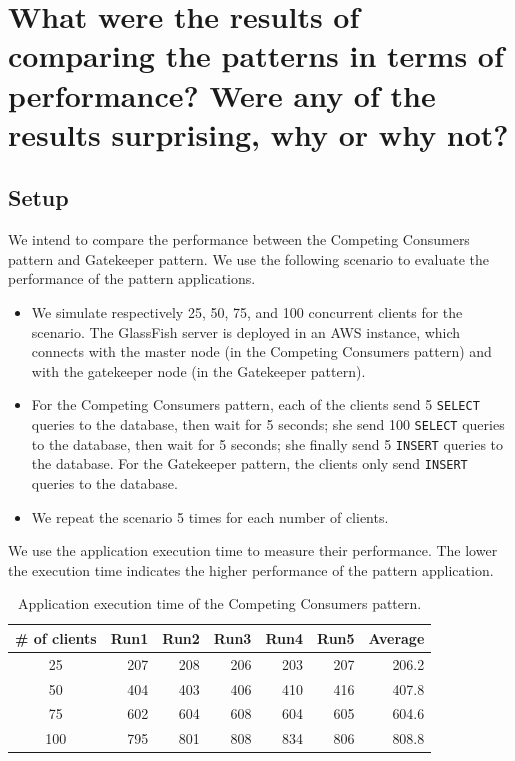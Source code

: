 \documentclass{article}
\begin{document}
\section{What were the results of comparing the patterns in terms of performance? Were any of the results surprising, why or why not?}\label{Q5}

\subsection{Setup}
We intend to compare the performance between the Competing Consumers pattern and Gatekeeper pattern. We use the following scenario to evaluate the performance of the pattern applications. 

\begin{itemize}
\item We simulate respectively 25, 50, 75, and 100 concurrent clients for the scenario. The GlassFish server is deployed in an AWS instance, which connects with the master node (in the Competing Consumers pattern) and with the gatekeeper node (in the Gatekeeper pattern).
\item For the Competing Consumers pattern, each of the clients send 5 \texttt{SELECT} queries to the database, then wait for 5 seconds; she send 100 \texttt{SELECT} queries to the database, then wait for 5 seconds; she finally send 5 \texttt{INSERT} queries to the database. For the Gatekeeper pattern, the clients only send \texttt{INSERT} queries to the database.
\item We repeat the scenario 5 times for each number of clients.
\end{itemize}

We use the application execution time to measure their performance. The lower the execution time indicates the higher performance of the pattern application.


\begin{table}[t]
    \centering
    \caption{Application execution time of the Competing Consumers pattern.}
    \label{tab:ccp_performance}
    \begin{tabular}{|c|r|r|r|r|r|r|}
        \hline
        \textbf{\# of clients} & \textbf{Run1} & \textbf{Run2} & \textbf{Run3} & \textbf{Run4} & \textbf{Run5} & \textbf{Average}\\ \hline
        25 & 207 & 208 & 206 & 203 & 207 & 206.2 \\ \hline 
        50 & 404 & 403 & 406 & 410 & 416 & 407.8 \\ \hline
        75 & 602 & 604 & 608 & 604 & 605 & 604.6 \\ \hline
        100 & 795 & 801 & 808 & 834 & 806 & 808.8 \\ \hline
	\end{tabular}
\end{table}
\end{document}
